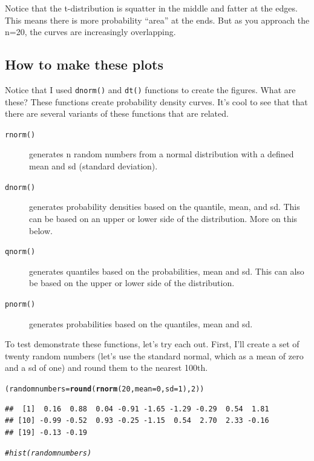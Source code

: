 \documentclass{tufte-handout}\usepackage[]{graphicx}\usepackage[]{color}
\makeatletter
\newcommand{\hlnum}[1]{\textcolor[rgb]{0.686,0.059,0.569}{#1}}%
\newcommand{\hlcom}[1]{\textcolor[rgb]{0.678,0.584,0.686}{\textit{#1}}}%
\newcommand{\hlstd}[1]{\textcolor[rgb]{0.345,0.345,0.345}{#1}}%
\newcommand{\hlkwb}[1]{\textcolor[rgb]{0.69,0.353,0.396}{#1}}%
\newcommand{\hlkwc}[1]{\textcolor[rgb]{0.333,0.667,0.333}{#1}}%
\newcommand{\hlkwd}[1]{\textcolor[rgb]{0.737,0.353,0.396}{\textbf{#1}}}%
\newenvironment{kframe}{%
 \def\at@end@of@kframe{}%
 \ifinner\ifhmode%
  \def\at@end@of@kframe{\end{minipage}}%
  \begin{minipage}{\columnwidth}%
 \fi\fi%
 \def\FrameCommand##1{\hskip\@totalleftmargin \hskip-\fboxsep
 \colorbox{shadecolor}{##1}\hskip-\fboxsep
     \hskip-\linewidth \hskip-\@totalleftmargin \hskip\columnwidth}%
 \MakeFramed {\advance\hsize-\width
   \@totalleftmargin\z@ \linewidth\hsize
   \@setminipage}}%
 {\par\unskip\endMakeFramed%
 \at@end@of@kframe}
\newenvironment{knitrout}{}{} %
\makeatother
\begin{document}
Notice that the t-distribution is squatter in the middle and fatter at the edges. This means there is more probability ``area'' at the ends. But as you approach the n=20, the curves are increasingly overlapping.

\subsection{How to make these plots}

Notice that I used \texttt{dnorm()} and \texttt{dt()} functions to create the figures. What are these? These functions create probability density curves. It's cool to see that that there are several variants of these functions that are related. 

\begin{description}
  \item[\texttt{rnorm()}] generates n random numbers from a normal distribution with a defined mean and sd (standard deviation).
  \item[\texttt{dnorm()}] generates probability densities based on the quantile, mean, and sd. This can be based on an upper or lower side of the distribution. More on this below.
  \item[\texttt{qnorm()}] generates quantiles based on the probabilities, mean and sd. This can also be based on the upper or lower side of the distribution. 
  \item[\texttt{pnorm()}] generates probabilities based on the quantiles, mean and sd.
\end{description}

\noindent To test demonstrate these functions, let's try each out. First, I'll create a set of twenty random numbers (let's use the standard normal, which as a mean of zero and a sd of one) and round them to the nearest 100th. 

\begin{knitrout}
\color{fgcolor}\begin{kframe}
\begin{alltt}
\hlstd{(randomnumbers} \hlkwb{=} \hlkwd{round}\hlstd{(}\hlkwd{rnorm}\hlstd{(}\hlnum{20}\hlstd{,} \hlkwc{mean}\hlstd{=}\hlnum{0}\hlstd{,} \hlkwc{sd}\hlstd{=}\hlnum{1}\hlstd{),} \hlnum{2}\hlstd{))}
\end{alltt}
\begin{verbatim}
##  [1]  0.16  0.88  0.04 -0.91 -1.65 -1.29 -0.29  0.54  1.81
## [10] -0.99 -0.52  0.93 -0.25 -1.15  0.54  2.70  2.33 -0.16
## [19] -0.13 -0.19
\end{verbatim}
\begin{alltt}
\hlcom{#hist(randomnumbers)}
\end{alltt}
\end{kframe}
\end{knitrout}
\end{document}
